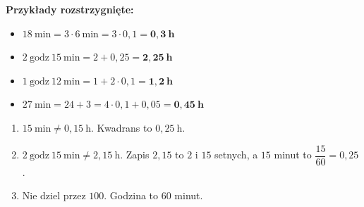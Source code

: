 \documentclass[11pt,a4paper]{article}
\begin{document}
\vspace{0.2em}
\textbf{Przykłady rozstrzygnięte:}
\begin{itemize}[leftmargin=*, itemsep=1pt]
  \item $18\ \text{min} = 3 \cdot 6\ \text{min} = 3\cdot 0{,}1 = \mathbf{0{,}3\ h}$
  \item $2\ \text{godz}\ 15\ \text{min} = 2 + 0{,}25 = \mathbf{2{,}25\ h}$
  \item $1\ \text{godz}\ 12\ \text{min} = 1 + 2\cdot 0{,}1 = \mathbf{1{,}2\ h}$
  \item $27\ \text{min} = 24 + 3 = 4\cdot 0{,}1 + 0{,}05 = \mathbf{0{,}45\ h}$
\end{itemize}

\begin{pulapka}
\begin{enumerate}[leftmargin=*, itemsep=2pt]
  \item $15\ \text{min}\neq 0{,}15\ \text{h}$. Kwadrans to $0{,}25\ \text{h}$.
  \item $2\ \text{godz}\ 15\ \text{min}\neq 2{,}15\ \text{h}$. Zapis $2{,}15$ to $2$ i $15$ setnych, a $15$ minut to $\dfrac{15}{60}=0{,}25$.
  \item Nie dziel przez $100$. Godzina to $60$ minut.
\end{enumerate}
\end{pulapka}
\end{document}
